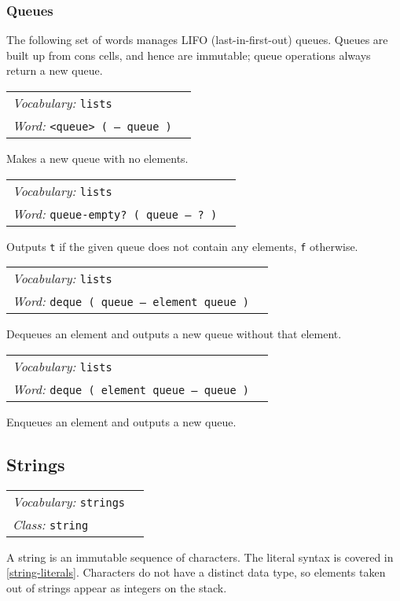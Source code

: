 \documentclass{book}
\newcommand{\vocabulary}[1]{\emph{Vocabulary:} \texttt{#1}&\\}
\newcommand{\ordinaryword}[2]{\index{\texttt{#1}}\emph{Word:} \texttt{#2}&\\}
\newcommand{\classword}[1]{\index{\texttt{#1}}\emph{Class:} \texttt{#1}&\\}
\newcommand{\wordtable}[1]{

\begin{tabularx}{12cm}[t]{lX}
\hline
#1
\hline
\end{tabularx}

}
\begin{document}
\subsubsection{Queues}

The following set of words manages LIFO (last-in-first-out) queues. Queues are built up from cons cells, and hence are immutable; queue operations always return a new queue.

\wordtable{
\vocabulary{lists}
\ordinaryword{<queue>}{<queue> ( -- queue )}
}
Makes a new queue with no elements.
\wordtable{
\vocabulary{lists}
\ordinaryword{queue-empty?}{queue-empty? ( queue -- ?~)}
}
Outputs \texttt{t} if the given queue does not contain any elements, \texttt{f} otherwise.
\wordtable{
\vocabulary{lists}
\ordinaryword{deque}{deque ( queue -- element queue )}
}
Dequeues an element and outputs a new queue without that element.
\wordtable{
\vocabulary{lists}
\ordinaryword{enque}{deque ( element queue -- queue )}
}
Enqueues an element and outputs a new queue.

\subsection{\label{strings}Strings}

\stringglos
\wordtable{
\vocabulary{strings}
\classword{string}
}
A string is an immutable sequence of characters. The literal syntax is covered in \ref{string-literals}. Characters do not have a distinct data type, so elements taken out of strings appear as integers on the stack.
\end{document}
